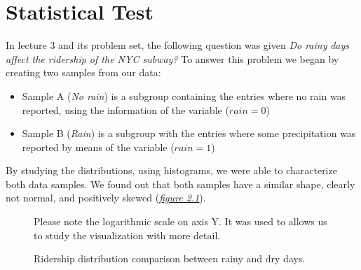 \documentclass[a4paper,12pt,english]{sphinxmanual}
\begin{document}
\chapter{Statistical Test}
\label{section1:statistical-test}\label{section1::doc}
In lecture 3 and its problem set, the following question was given \emph{Do rainy}
\emph{days affect the ridership of the NYC subway?} To answer this problem we began
by creating two samples from our data:
\begin{itemize}
\item {} 
Sample A (\emph{No rain}) is a subgroup containing the entries where no rain was
reported, using the information of the  variable (\(rain = 0\))

\item {} 
Sample B (\emph{Rain}) is a subgroup with the entries where some precipitation was
reported by means of the  variable (\(rain = 1\))

\end{itemize}

By studying the distributions, using histograms, we were able to characterize
both data samples. We found out that both samples have a similar shape, clearly
not normal, and positively skewed ({\hyperref[section1:figure21]{\emph{figure 2.1}}}).
\begin{figure}[htbp]
\centering
\capstart

\caption{Ridership distribution comparison between rainy and dry days.}{\small 
Please note the logarithmic scale on axis Y. It was used to allows us to
study the visualization with more detail.
}\label{section1:figure21}\end{figure}
\end{document}
